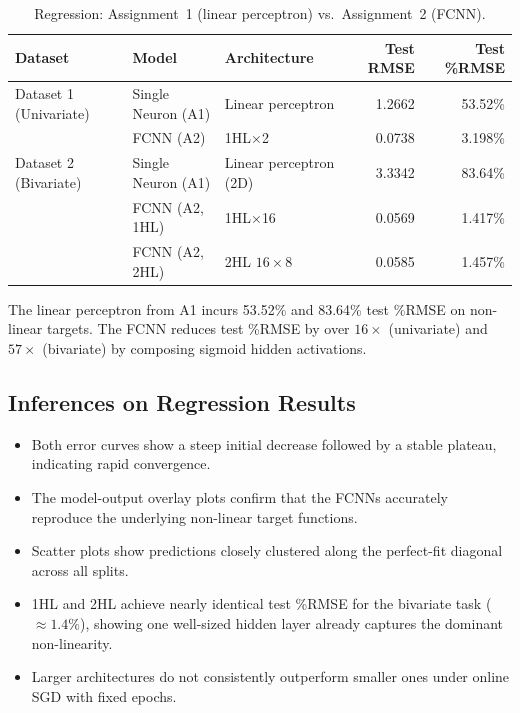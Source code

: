 \documentclass[11pt,a4paper]{article}
\begin{document}
\begin{table}[H]
\centering
\caption{Regression: Assignment~1 (linear perceptron) vs.\ Assignment~2 (FCNN).}
\begin{tabular}{lllrr}
\toprule
Dataset & Model & Architecture & Test RMSE & Test \%RMSE \\
\midrule
Dataset 1 (Univariate) & Single Neuron (A1) & Linear perceptron & 1.2662 & 53.52\% \\
                        & FCNN (A2) & 1HL$\times$2 & 0.0738 & 3.198\% \\
\midrule
Dataset 2 (Bivariate)  & Single Neuron (A1) & Linear perceptron (2D) & 3.3342 & 83.64\% \\
                        & FCNN (A2, 1HL) & 1HL$\times$16 & 0.0569 & 1.417\% \\
                        & FCNN (A2, 2HL) & 2HL $16\times8$ & 0.0585 & 1.457\% \\
\bottomrule
\end{tabular}
\end{table}

The linear perceptron from A1 incurs 53.52\% and 83.64\% test \%RMSE on non-linear targets. The FCNN reduces test \%RMSE by over $16\times$ (univariate) and $57\times$ (bivariate) by composing sigmoid hidden activations.

\subsection{Inferences on Regression Results}
\begin{itemize}
    \item Both error curves show a steep initial decrease followed by a stable plateau, indicating rapid convergence.
    \item The model-output overlay plots confirm that the FCNNs accurately reproduce the underlying non-linear target functions.
    \item Scatter plots show predictions closely clustered along the perfect-fit diagonal across all splits.
    \item 1HL and 2HL achieve nearly identical test \%RMSE for the bivariate task ($\approx 1.4\%$), showing one well-sized hidden layer already captures the dominant non-linearity.
    \item Larger architectures do not consistently outperform smaller ones under online SGD with fixed epochs.
\end{itemize}

\end{document}
